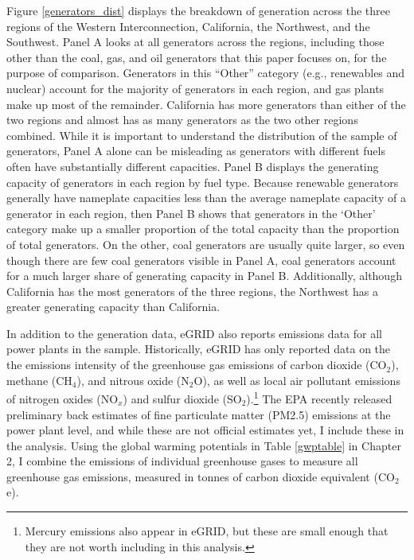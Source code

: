 Figure \ref{generators_dist} displays the breakdown of generation across the three regions of the Western Interconnection, California, the Northwest, and the Southwest. Panel A looks at all generators across the regions, including those other than the coal, gas, and oil generators that this paper focuses on, for the purpose of comparison. Generators in this ``Other'' category (e.g., renewables and nuclear) account for the majority of generators in each region, and gas plants make up most of the remainder. California has more generators than either of the two regions and almost has as many generators as the two other regions combined. While it is important to understand the distribution of the sample of generators, Panel A alone can be misleading as generators with different fuels often have substantially different capacities. Panel B displays the generating capacity of generators in each region by fuel type. Because renewable generators generally have nameplate capacities less than the average nameplate capacity of a generator in each region, then Panel B shows that generators in the `Other' category make up a smaller proportion of the total capacity than the proportion of total generators. On the other, coal generators are usually quite larger, so even though there are few coal generators visible in Panel A, coal generators account for a much larger share of generating capacity in Panel B. Additionally, although California has the most generators of the three regions, the Northwest has a greater generating capacity than California. 

In addition to the generation data, eGRID also reports emissions data for all power plants in the sample. Historically, eGRID has only reported data on the the emissions intensity of the greenhouse gas emissions of carbon dioxide (CO$_2$), methane (CH$_4$), and nitrous oxide (N$_2$O), as well as local air pollutant emissions of nitrogen oxides (NO$_x$) and sulfur dioxide (SO$_2$).\footnote{Mercury emissions also appear in eGRID, but these are small enough that they are not worth including in this analysis.} The EPA recently released preliminary back estimates of fine particulate matter (PM2.5) emissions at the power plant level, and while these are not official estimates yet, I include these in the analysis. Using the global warming potentials in Table \ref{gwptable} in Chapter 2, I combine the emissions of individual greenhouse gases to measure all greenhouse gas emissions, measured in tonnes of carbon dioxide equivalent (CO$_2$e). 

